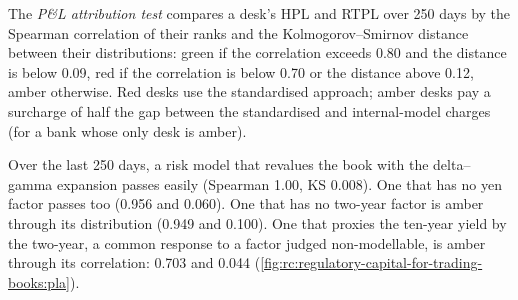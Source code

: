\begin{definition}\label{def:rc:regulatory-capital-for-trading-books:pla}
The \emph{P\&L attribution test} compares a desk's HPL and RTPL over
250 days by the Spearman correlation of their ranks and the Kolmogorov--Smirnov distance between
their distributions: green if the correlation exceeds 0.80 and the distance is below 0.09, red if
the correlation is below 0.70 or the distance above 0.12, amber otherwise. Red desks use the
standardised approach; amber desks pay a surcharge of half the gap between the standardised and
internal-model charges (for a bank whose only desk is amber).
\end{definition}

\label{lst:rc:regulatory-capital-for-trading-books:pla}

\begin{example}\label{ex:rc:regulatory-capital-for-trading-books:pla}
Over the last 250 days, a risk model that revalues the book with the delta--gamma expansion
passes easily (Spearman 1.00, KS 0.008). One that has no yen factor passes too (0.956 and 0.060).
One that has no two-year factor is amber through its distribution (0.949 and 0.100). One that
proxies the ten-year yield by the two-year, a common response to a factor judged non-modellable,
is amber through its correlation: 0.703 and 0.044 (\cref{fig:rc:regulatory-capital-for-trading-books:pla}).
\end{example}

\begin{omfigure}

\label{fig:rc:regulatory-capital-for-trading-books:pla}
\end{omfigure}


